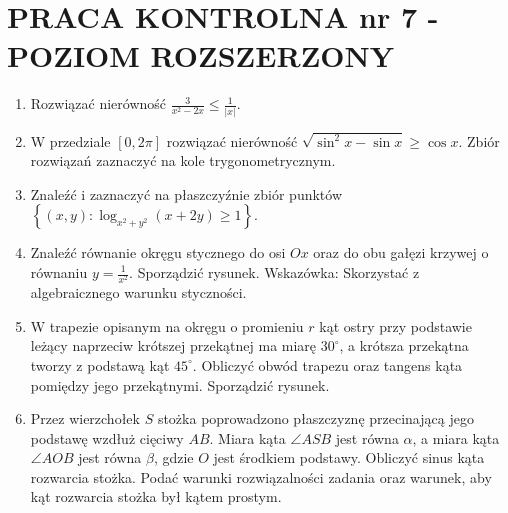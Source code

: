 \documentclass[10pt]{article}
\begin{document}
\section*{PRACA KONTROLNA nr 7 - POZIOM ROZSZERZONY}
\begin{enumerate}
  \item Rozwiązać nierówność $\frac{3}{x^{2}-2 x} \leqslant \frac{1}{|x|}$.
  \item W przedziale $[0,2 \pi]$ rozwiązać nierówność $\sqrt{\sin ^{2} x-\sin x} \geqslant \cos x$. Zbiór rozwiązań zaznaczyć na kole trygonometrycznym.
  \item Znaleźć i zaznaczyć na płaszczyźnie zbiór punktów $\left\{(x, y): \log _{x^{2}+y^{2}}(x+2 y) \geqslant 1\right\}$.
  \item Znaleźć równanie okręgu stycznego do osi $O x$ oraz do obu gałęzi krzywej o równaniu $y=\frac{1}{x^{2}}$. Sporządzić rysunek. Wskazówka: Skorzystać z algebraicznego warunku styczności.
  \item W trapezie opisanym na okręgu o promieniu $r$ kąt ostry przy podstawie leżący naprzeciw krótszej przekątnej ma miarę $30^{\circ}$, a krótsza przekątna tworzy z podstawą kąt $45^{\circ}$. Obliczyć obwód trapezu oraz tangens kąta pomiędzy jego przekątnymi. Sporządzić rysunek.
  \item Przez wierzchołek $S$ stożka poprowadzono płaszczyznę przecinającą jego podstawę wzdłuż cięciwy $A B$. Miara kąta $\angle A S B$ jest równa $\alpha$, a miara kąta $\angle A O B$ jest równa $\beta$, gdzie $O$ jest środkiem podstawy. Obliczyć sinus kąta rozwarcia stożka. Podać warunki rozwiązalności zadania oraz warunek, aby kąt rozwarcia stożka był kątem prostym.
\end{enumerate}
\end{document}
